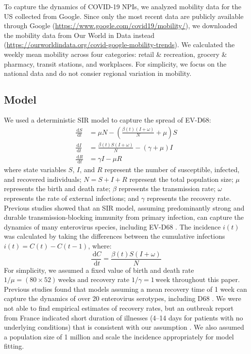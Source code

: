 \documentclass[12pt]{article}
\newcommand{\dd}[1]{\ensuremath{\, \mathrm{d}#1}}
\begin{document}
To capture the dynamics of COVID-19 NPIs, we analyzed mobility data for the US collected from Google.
Since only the most recent data are publicly available through Google (\url{https://www.google.com/covid19/mobility/}), we downloaded the mobility data from Our World in Data instead (\url{https://ourworldindata.org/covid-google-mobility-trends}).
We calculated the weekly mean mobility across four categories: retail \& recreation, grocery \& pharmacy, transit stations, and workplaces.
For simplicity, we focus on the national data and do not consier regional variation in mobility.

\subsection{Model}

We used a deterministic SIR model to capture the spread of EV-D68:
\begin{align}
\frac{\dd{S}}{\dd{t}} &= \mu N - \left(\frac{\beta(t) (I + \omega)}{N} + \mu\right) S\\
\frac{\dd{I}}{\dd{t}} &= \frac{\beta(t) S (I + \omega)}{N} - (\gamma + \mu) I\\
\frac{\dd{R}}{\dd{t}} &= \gamma I - \mu R
\end{align}
where state variables
$S$, $I$, and $R$ represent the number of susceptible, infected, and recovered individuals;
$N = S + I + R$ represent the total population size;
$\mu$ represents the birth and death rate;
$\beta$ represents the transmission rate;
$\omega$ represents the rate of external infections;
and $\gamma$ represents the recovery rate.
Previous studies showed that an SIR model, assuming predominantly strong and durable
transmission-blocking immunity from primary infection, can capture the dynamics of many enterovirus species, including EV-D68 \citep{pons2018serotype,park2021epidemiological}.
The incidence $i(t)$ was calculated by taking the differences between the cumulative infections $i(t) = C(t) - C(t-1)$, where:
\begin{equation}
\frac{\dd{C}}{\dd{t}} = \frac{\beta(t) S (I + \omega)}{N}
\end{equation}
For simplicity, we assumed a fixed value of birth and death rate $1/\mu = (80\times 52)\,\textrm{weeks}$ and recovery rate $1/\gamma=1\,\textrm{week}$ throughout this paper.
Previous studies found that models assuming a mean recovery time of 1 week can capture the dynamics of over 20 enterovirus serotypes, including D68 \citep{pons2018serotype,park2021epidemiological}.
We were not able to find empirical estimates of recovery rates, but an outbreak report from France indicated short duration of illnesses (4--14 days for patients with no underlying conditions) that is consistent with our assumption \citep{midgley2015emergence}.
We also assumed a population size of 1 million and scale the incidence appropriately for model fitting.
\end{document}

